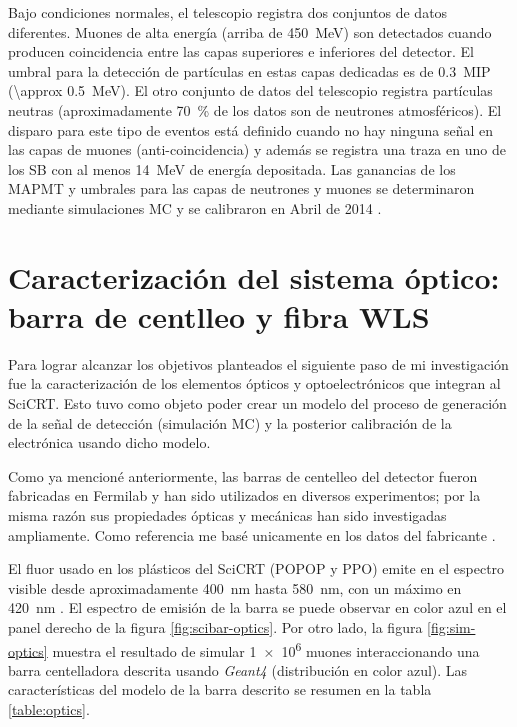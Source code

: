 Bajo condiciones normales, el telescopio registra dos conjuntos de datos diferentes. Muones de alta energía (arriba de \SI{450}{\mega\electronvolt}) son detectados cuando producen coincidencia entre las capas superiores e inferiores del detector. El umbral para la detección de partículas en estas capas dedicadas es de \SI{0.3}{MIP} (\SI{\approx 0.5}{\mega\electronvolt}). El otro conjunto de datos del telescopio registra partículas neutras (aproximadamente \SI{70}{\percent} de los datos son de neutrones atmosféricos). El disparo para este tipo de eventos está definido cuando no hay ninguna señal en las capas de muones (anti-coincidencia) y además se registra una traza en uno de los SB con al menos \SI{14}{\mega\electronvolt} de energía depositada. Las ganancias de los MAPMT y umbrales para las capas de neutrones y muones se determinaron mediante simulaciones MC y se calibraron en Abril de \num{2014} \cite{ysasai14}.

\section{Caracterización del sistema óptico: barra de centlleo y fibra WLS}

Para lograr alcanzar los objetivos planteados el siguiente paso de mi investigación fue la caracterización de los elementos ópticos y optoelectrónicos que integran al SciCRT. Esto tuvo como objeto poder crear un modelo del proceso de generación de la señal de detección (simulación MC) y la posterior calibración de la electrónica usando dicho modelo.

Como ya mencioné anteriormente, las barras de centelleo del detector fueron fabricadas en Fermilab y han sido utilizados en diversos experimentos; por la misma razón sus propiedades ópticas y mecánicas han sido investigadas ampliamente. Como referencia me basé unicamente en los datos del fabricante \cite{beznosko}.

El fluor usado en los plásticos del SciCRT (POPOP y PPO) emite en el espectro visible desde aproximadamente \SI{400}{\nano\metre} hasta \SI{580}{\nano\metre}, con un máximo en \SI{420}{\nano\metre} \cite{kikawa14}. El espectro de emisión de la barra se puede observar en color azul en el panel derecho de la figura \ref{fig:scibar-optics}. Por otro lado, la figura \ref{fig:sim-optics} muestra el resultado de simular \num{1e6} muones interaccionando una barra centelladora descrita usando \emph{Geant4} \cite{geant403,geant406} (distribución en color azul). Las características del modelo de la barra descrito se resumen en la tabla \ref{table:optics}.

